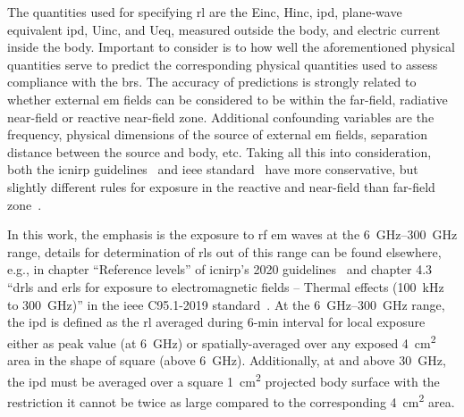 The quantities used for specifying \gls{rl} are the \gls{Einc}, \gls{Hinc}, \gls{ipd}, plane-wave equivalent \gls{ipd}, \gls{Uinc}, and \gls{Ueq}, measured outside the body, and electric current inside the body.
Important to consider is to how well the aforementioned physical quantities serve to predict the corresponding physical quantities used to assess compliance with the \gls{br}s.
The accuracy of predictions is strongly related to whether external \gls{em} fields can be considered to be within the far-field, radiative near-field or reactive near-field zone.
Additional confounding variables are the frequency, physical dimensions of the source of external \gls{em} fields, separation distance between the source and body, etc.
Taking all this into consideration, both the \gls{icnirp} guidelines~\cite{ICNIRP2020Guidelines} and \gls{ieee} standard~\cite{IEEE2019Standard} have more conservative, but slightly different rules for exposure in the reactive and near-field than far-field zone~\cite{Hirata2020Difference}.

In this work, the emphasis is the exposure to \gls{rf} \gls{em} waves at the \SIrange[range-units=single,range-phrase=--]{6}{300}{\GHz} range, details for determination of \gls{rl}s out of this range can be found elsewhere, e.g., in chapter ``Reference levels'' of \gls{icnirp}'s 2020 guidelines~\cite{ICNIRP2020Guidelines} and chapter 4.3 ``\gls{drl}s and \gls{erl}s for exposure to electromagnetic fields -- Thermal effects (\SI{100}{\kHz} to \SI{300}{\GHz})'' in the \gls{ieee} C95.1-2019 standard~\cite{IEEE2019Standard}.
At the \SIrange[range-units=single,range-phrase=--]{6}{300}{\GHz} range, the \gls{ipd} is defined as the \gls{rl} averaged during 6-min interval for local exposure either as peak value (at \SI{6}{\GHz}) or spatially-averaged over any exposed \SI{4}{\cm\squared} area in the shape of square (above \SI{6}{\GHz}).
Additionally, at and above \SI{30}{\GHz}, the \gls{ipd} must be averaged over a square \SI{1}{\cm\squared} projected body surface with the restriction it cannot be twice as large compared to the corresponding \SI{4}{\cm\squared} area.

